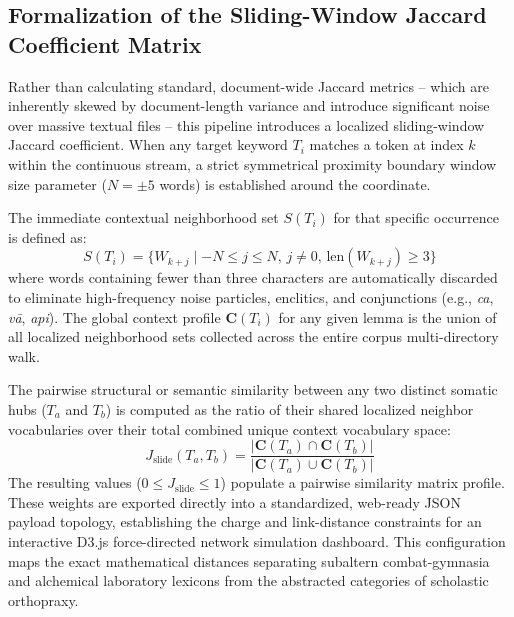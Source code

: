 \documentclass[11pt,twoside,letterpaper]{article}
\begin{document}
\subsection{Formalization of the Sliding-Window Jaccard Coefficient Matrix}
Rather than calculating standard, document-wide Jaccard metrics -- which are inherently skewed by document-length variance and introduce significant noise over massive textual files -- this pipeline introduces a localized sliding-window Jaccard coefficient. When any target keyword $T_i$ matches a token at index $k$ within the continuous stream, a strict symmetrical proximity boundary window size parameter ($N = \pm 5$ words) is established around the coordinate.

The immediate contextual neighborhood set $S(T_i)$ for that specific occurrence is defined as:
\begin{equation}
S(T_i) = \{W_{k+j} \mid -N \le j \le N, \, j \neq 0, \, \text{len}(W_{k+j}) \ge 3\}
\end{equation}
where words containing fewer than three characters are automatically discarded to eliminate high-frequency noise particles, enclitics, and conjunctions (e.g., \textit{ca}, \textit{vā}, \textit{api}). The global context profile $\mathbf{C}(T_i)$ for any given lemma is the union of all localized neighborhood sets collected across the entire corpus multi-directory walk.

The pairwise structural or semantic similarity between any two distinct somatic hubs ($T_a$ and $T_b$) is computed as the ratio of their shared localized neighbor vocabularies over their total combined unique context vocabulary space:
\begin{equation}
J_{\text{slide}}(T_a, T_b) = \frac{\vert\mathbf{C}(T_a) \cap \mathbf{C}(T_b)\vert}{\vert\mathbf{C}(T_a) \cup \mathbf{C}(T_b)\vert}
\end{equation}
The resulting values ($0 \le J_{\text{slide}} \le 1$) populate a pairwise similarity matrix profile. These weights are exported directly into a standardized, web-ready JSON payload topology, establishing the charge and link-distance constraints for an interactive D3.js force-directed network simulation dashboard. This configuration maps the exact mathematical distances separating subaltern combat-gymnasia and alchemical laboratory lexicons from the abstracted categories of scholastic orthopraxy.
\end{document}

